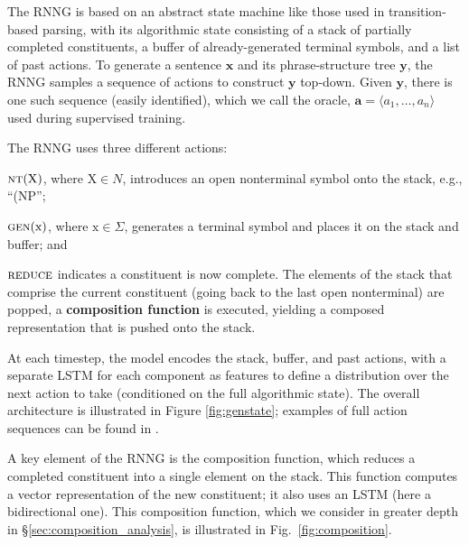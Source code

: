 \documentclass[11pt]{article}
\newenvironment{itemizesquish}{\begin{list}{\setcounter{enumi}{0}\labelitemi}{\setlength{\itemsep}{-0.25em}\setlength{\labelwidth}{0.5em}\setlength{\leftmargin}{\labelwidth}\addtolength{\leftmargin}{\labelsep}}}{\end{list}}
\begin{document}
The RNNG is based on an abstract state machine like those used in transition-based parsing, with its algorithmic state consisting of a stack of partially completed constituents, a buffer of already-generated terminal symbols, and a list of past actions. To generate a sentence $\boldsymbol{x}$ and its phrase-structure tree $\boldsymbol{y}$, the RNNG samples a sequence of actions to construct $\boldsymbol{y}$ top-down. Given $\boldsymbol{y}$, there is one such sequence (easily identified), which we call the oracle, $\boldsymbol{a} = \langle a_1,\ldots,a_n \rangle$ used during supervised training.

The RNNG uses three different actions:
\begin{itemizesquish}
\item $\textsc{nt}(\mathrm{X})$, where $\mathrm{X} \in N$, introduces an open nonterminal symbol onto the stack, e.g., ``(NP'';
\item $\textsc{gen}(\mathrm{x})$, where $\mathrm{x} \in \Sigma$, generates a terminal symbol and places it on the stack and buffer; and
\item $\textsc{reduce}$ indicates a constituent is now complete.  The elements of the stack that comprise the current constituent (going back to the last open nonterminal) are popped, a \textbf{composition function} is executed, yielding a composed representation that is pushed onto the stack.
\end{itemizesquish}

At each timestep, the model encodes the stack, buffer, and past actions, with a separate LSTM \cite{hochreiter_97} for each component as features to define a distribution over the next action to take (conditioned on the full algorithmic state).  
The overall architecture is illustrated in Figure \ref{fig:genstate}; examples of full action sequences can be found in .

A key element of the RNNG is the composition function, which reduces a completed constituent into a single element on the stack.  This function computes a vector representation of the new constituent; it also uses an LSTM (here a bidirectional one).  This composition function, which we consider in greater depth in \S\ref{sec:composition_analysis}, is illustrated in Fig.~\ref{fig:composition}.
\end{document}
